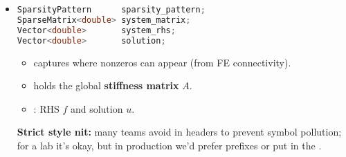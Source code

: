 \begin{itemize}
    \item {}
    \begin{lstlisting}[language=C++]
SparsityPattern      sparsity_pattern;
SparseMatrix<double> system_matrix;
Vector<double>       system_rhs;
Vector<double>       solution;\end{lstlisting}
    \begin{itemize}
        \item {} captures where nonzeros can appear (from FE connectivity).
        \item {} holds the global \textbf{stiffness matrix} $A$.
        \item {}: RHS $f$ and solution $u$.
    \end{itemize}
    \textcolor{Red2}{ \textbf{Strict style nit:}} many teams avoid  in headers to prevent symbol pollution; for a lab it's okay, but in production we'd prefer  prefixes or put  in the .
\end{itemize}